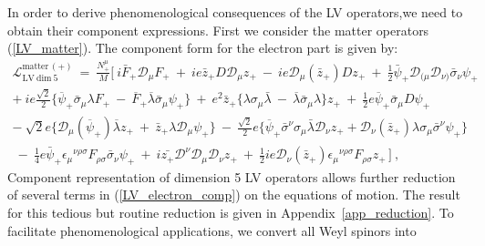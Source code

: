 \documentclass[12pt]{revtex4}
\begin{document}
In order to derive phenomenological consequences of 
the LV operators,we need to obtain their component expressions.
First we consider the matter operators (\ref{LV_matter}).
The component form for the electron part is given by: 
\begin{gather}
\nonumber
  \mathcal{L}_{\mathrm{LV~dim~5}}^{\mathrm{matter\,(+)}} 
~ =~ \frac{N_+^\mu}{M} \Big[~
    i \bar{F}_+ \mathcal{D}_\mu F_+ ~+~
    i e \bar{z}_+ D \mathcal{D}_\mu z_+ ~-~
    i e \mathcal{D}_\mu(\bar{z}_+) D z_+ 
~+~ 
  \frac{1}{2}\bar{\psi}_+\mathcal{D}_{(\mu}\mathcal{D}_{\nu)}
               \bar{\sigma}_\nu \psi_+ 
\nonumber \\
  + ~ 
    i e \frac{\sqrt{2}}{2} \Big\{
               \overline{\psi}_+\bar\sigma_\mu\lambda F_+ 
       ~-~
               \overline{F}_+\overline{\lambda} \bar\sigma_\mu \psi_+
                         \Big\}  ~+~
    e^2 \bar{z}_+ \Big\{
               \lambda\sigma_\mu\bar{\lambda} 
       ~-~
               \overline{\lambda}\bar\sigma_\mu\lambda 
                       \Big\} z_+ 
~+~ 
    \frac{1}{2} e \overline{\psi}_+\bar\sigma_\mu D\psi_+
\nonumber \\
\nonumber
 -~ 
   \sqrt{2} e \Big\{ 
                     \mathcal{D}_\mu(\overline{\psi}_+)\overline{\lambda} z_+ 
     ~+~ 
                     \bar{z}_+ \lambda \mathcal{D}_\mu \psi_+ 
                     \Big\} 
    ~-~ 
    \frac{\sqrt{2}}{2} e \Big\{ 
                      \overline{\psi}_+\bar\sigma^\nu\sigma_\mu 
                     \bar{\lambda}\mathcal{D}_\nu z_+ +
                     \mathcal{D}_\nu(\bar{z}_+)\lambda\sigma_\mu
                     \bar{\sigma}^\nu \psi_+
                     \Big\}
   \\
  ~ -~
  \frac{1}{4} e \bar{\psi}_+\epsilon_\mu{}^{\nu\rho\sigma}
              F_{\rho\sigma} \bar{\sigma}_\nu \psi_+
   ~+~
  i \bar{z_+} \mathcal{D}^\nu \mathcal{D}_\mu \mathcal{D}_\nu z_+ 
   ~+~
   \frac{1}{2} i e \mathcal{D}_\nu (\bar{z}_+) \epsilon_\mu{}^{\nu\rho\sigma}
              F_{\rho\sigma} z_+ \, 
   \Big] ~,
\label{LV_electron_comp}
\end{gather}
%
Component representation  of dimension 5 LV operators allows further
reduction of several terms in (\ref{LV_electron_comp}) on the
equations of motion. The result for this tedious but routine reduction
is given in Appendix~\ref{app_reduction}. To facilitate
phenomenological applications, we convert all Weyl spinors into
\end{document}

